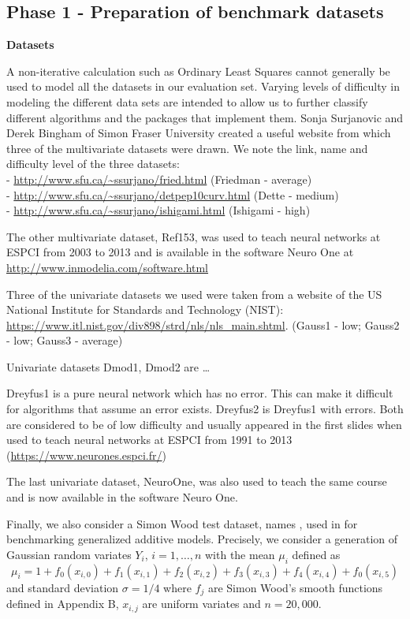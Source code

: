 \hypertarget{phase-1---preparation-of-benchmark-datasets}{%
\subsection{Phase 1 - Preparation of benchmark
datasets}\label{phase-1---preparation-of-benchmark-datasets}}

\textbf{Datasets}

A non-iterative calculation such as Ordinary Least Squares cannot
generally be used to model all the datasets in our evaluation set.
Varying levels of difficulty in modeling the different data sets are
intended to allow us to further classify different algorithms and the
packages that implement them. Sonja Surjanovic and Derek Bingham of
Simon Fraser University created a useful website from which three of the
multivariate datasets were drawn. We note the link, name and difficulty
level of the three datasets:\\
- \url{http://www.sfu.ca/~ssurjano/fried.html} (Friedman - average)\\
- \url{http://www.sfu.ca/~ssurjano/detpep10curv.html} (Dette - medium)\\
- \url{http://www.sfu.ca/~ssurjano/ishigami.html} (Ishigami - high)

The other multivariate dataset, Ref153, was used to teach neural
networks at ESPCI from 2003 to 2013 and is available in the software
Neuro One at \url{http://www.inmodelia.com/software.html}

Three of the univariate datasets we used were taken from a website of
the US National Institute for Standards and Technology (NIST):
\url{https://www.itl.nist.gov/div898/strd/nls/nls_main.shtml}. (Gauss1 -
low; Gauss2 - low; Gauss3 - average)

Univariate datasets Dmod1, Dmod2 are \ldots{}

Dreyfus1 is a pure neural network which has no error. This can make it
difficult for algorithms that assume an error exists. Dreyfus2 is
Dreyfus1 with errors. Both are considered to be of low difficulty and
usually appeared in the first slides when used to teach neural networks
at ESPCI from 1991 to 2013 (\url{https://www.neurones.espci.fr/})

The last univariate dataset, NeuroOne, was also used to teach the same
course and is now available in the software Neuro One.

Finally, we also consider a Simon Wood test dataset, names
, used in \citep{wood2011fast} for benchmarking
generalized additive models. Precisely, we consider a generation of
Gaussian random variates \(Y_i\), \(i=1,\dots,n\) with the mean
\(\mu_i\) defined as \[
\mu_i = 1+ f_0(x_{i,0})+f_1(x_{i,1})+f_2(x_{i,2})+f_3(x_{i,3})
+f_4(x_{i,4})+f_0(x_{i,5})
\] and standard deviation \(\sigma=1/4\) where \(f_j\) are Simon Wood's
smooth functions defined in Appendix B, \(x_{i,j}\) are uniform variates
and \(n=20,000\).

